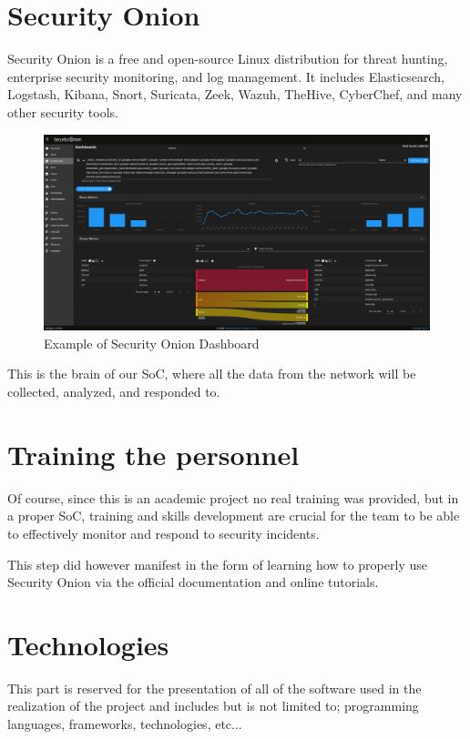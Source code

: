 \section{Security Onion}
Security Onion is a free and open-source Linux distribution for threat hunting, enterprise security monitoring, and log management.
It includes Elasticsearch, Logstash, Kibana, Snort, Suricata, Zeek, Wazuh, TheHive, CyberChef, and many other security tools.

\begin{figure}[H]
    \centering
    \includegraphics[width=1\textwidth]{src/assets/images/security-onion-sample.png}
    \caption{Example of Security Onion Dashboard}
\end{figure}

This is the brain of our SoC, where all the data from the network will be collected, analyzed, and responded to.

\section{Training the personnel}
Of course, since this is an academic project no real training was provided, but in a proper SoC, training and skills development are crucial for the team to be able to effectively monitor and respond to security incidents.

This step did however manifest in the form of learning how to properly use Security Onion via the official documentation and online tutorials.

\section{Technologies}
This part is reserved for the presentation of all of the software used in the realization of the project and includes but is not limited to; programming languages, frameworks, technologies, etc...

